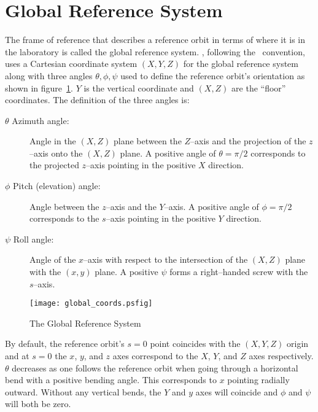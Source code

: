 \section{Global Reference System}
\label{s:global}

The frame of reference that describes a reference orbit in terms of where it
is in the laboratory is called the global reference system.
\bmad, following the \mad\ convention, uses a Cartesian coordinate system
$(X, Y, Z)$ for the global reference system along with three angles
$\theta, \phi, \psi$ used to define the reference orbit's orientation
as shown in figure~\ref{f:global_coords}. $Y$ is the vertical
coordinate and $(X, Z)$ are the ``floor'' coordinates.  The definition
of the three angles is:
\begin{description}
\item[$\theta$ Azimuth angle:] Angle in the $(X, Z)$ plane 
between the $Z$--axis and the projection of the $z$--axis onto the
$(X, Z)$ plane. A positive angle of $\theta = \pi/2$ corresponds to the
projected $z$--axis pointing in the positive $X$ direction.
\item[$\phi$ Pitch (elevation) angle:] Angle between the $z$--axis 
and the $Y$--axis. A positive angle of $\phi = \pi/2$ corresponds to
the $s$--axis pointing in the positive $Y$ direction.
\item[$\psi$ Roll angle:] Angle of the $x$--axis with respect 
to the intersection of the $(X, Z)$ plane with the $(x, y)$ plane. A
positive $\psi$ forms a right--handed screw with the $s$--axis.
\end{description}

\begin{figure}
\centering
\texttt{[image: global\_coords.psfig]}
\caption{The Global Reference System}
\label{f:global_coords}
\end{figure}

By default, the reference orbit's $s = 0$ point coincides with the
$(X, Y, Z)$ origin and at $s = 0$ the $x$, $y$, and $z$ axes
correspond to the $X$, $Y$, and $Z$ axes respectively. $\theta$
decreases as one follows the reference orbit when going through a
horizontal bend with a positive bending angle. This corresponds to $x$
pointing radially outward. Without any vertical bends, the $Y$ and $y$
axes will coincide and $\phi$ and $\psi$ will both be zero.

